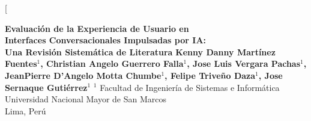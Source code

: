 \documentclass[11pt,twocolumn]{article}
\begin{document}
\twocolumn[
\begin{@twocolumnfalse}
\vspace*{-1cm}
\begin{center}
{\LARGE\bfseries Evaluación de la Experiencia de Usuario en\\[4pt]
Interfaces Conversacionales Impulsadas por IA:\\[2pt]
Una Revisión Sistemática de Literatura}
\vspace{0.5cm}
{\large\textbf{Kenny Danny Martínez Fuentes$^{1}$, 
Christian Angelo Guerrero Falla$^{1}$, 
Jose Luis Vergara Pachas$^{1}$,\\
JeanPierre D'Angelo Motta Chumbe$^{1}$, 
Felipe Triveño Daza$^{1}$, 
Jose Sernaque Gutiérrez$^{1}$}}
\vspace{0.3cm}
{\small
$^{1}$ Facultad de Ingeniería de Sistemas e Informática\\
Universidad Nacional Mayor de San Marcos\\
Lima, Perú
}
\end{center}
\vspace{0.5cm}


\end{@twocolumnfalse}
\end{document}
